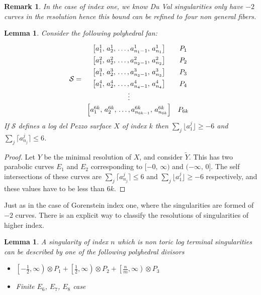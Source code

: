 \documentclass[12pt]{amsart}
\theoremstyle{plain}
\newtheorem{lem}[thm]{Lemma}
\newtheorem*{rem}{Remark}
\begin{document}
\begin{rem}
In the case of index one, we know Du Val singularities only have $-2$ curves in the resolution hence this bound can be refined to four non general fibers.
\end{rem}

\begin{lem}{\label{MaxLength}}
Consider the following polyhedral fan:
\[\def\arraystretch{1.4}
\mathcal{S} = 
\begin{array}{cc}
\left[a_1^1, \, a_2^1,\,  \dots, a_{n_1 - 1}^1, \, a_{n_1}^1 \right] & P_1 \\
\left[a_1^2, \, a_2^2,\,  \dots, a_{n_2 - 1}^2, \, a_{n_2}^2 \right] & P_2 \\
\left[a_1^3, \, a_2^3,\,  \dots, a_{n_3 - 1}^3, \, a_{n_3}^3 \right] & P_3 \\
\left[a_1^4, \, a_2^4,\,  \dots, a_{n_4 - 1}^4, \, a_{n_4}^4 \right] & P_4 \\
\vdots \\
\left[ a_1^{6k}, \, a_2^{6k}, \,  \dots, a_{n_{6k-1}}^{6k}, \, a_{n_{6k}}^{6k} \right] & P_{6k} \\
\end{array}
\] 
If $\mathcal{S}$ defines a log del Pezzo surface $X$ of index $k$ then $\sum_j \lfloor a_1^j \rfloor \geq -6$ and $\sum_j \lceil a_{n_j}^{j} \rceil \leq 6$.
\end{lem}
\begin{proof}
Let $Y$ be the minimal resolution of $X$, and consider $\widetilde{Y}$. This has two parabolic curves $E_1$ and $E_2$ corresponding to $[-0, \, \infty)$ and $(-\infty, \, 0]$. The self intersections of these curves are $\sum_j \lceil a_{n_j}^{j} \rceil \leq 6$ and $\sum_j \lfloor a_1^j \rfloor \geq -6$ respectively, and these values have to be less than $6k$.
\end{proof}

Just as in the case of Gorenstein index one, where the singularities are formed of $-2$ curves. There is an explicit way to classify the resolutions of singularities of higher index.

\begin{lem}\label{basic bound}
A singularity of index $n$ which is non toric log terminal singularities can be described by one of the following polyhedral divisors
\begin{itemize}
\item $\left[-\frac{1}{2}, \infty \right) \otimes P_1 + \left[ \frac{1}{2}, \infty \right) \otimes P_2 + \left[ \frac{n}{m}, \infty \right) \otimes P_3$

\item Finite $E_6$, $E_7$, $E_8$ case
\end{itemize}
\end{lem}
\end{document}
